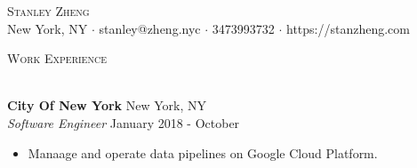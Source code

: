 \documentclass[a4paper]{article}
\newcommand{\lineunder} {
    \vspace*{-8pt} \\
    \hspace*{-18pt} \hrulefill \\
}
\newcommand{\header} [1] {
    {\hspace*{-18pt}\vspace*{6pt} \textsc{#1}}
    \vspace*{-6pt} \lineunder
}
\begin{document}
\vspace*{-40pt}

    

\vspace*{-10pt}
\begin{center}
	{\Huge \scshape {Stanley Zheng}}\\
	New York, NY $\cdot$ stanley@zheng.nyc $\cdot$ 3473993732 $\cdot$ https://stanzheng.com\\
\end{center}

\header{Work Experience}
\vspace{1mm}

\textbf{City Of New York} \hfill New York, NY\\
\textit{Software Engineer} \hfill January 2018 - October\\
\vspace{-1mm}
\begin{itemize} \itemsep 1pt
	\item Manaage and operate data pipelines on Google Cloud Platform.
\end{itemize}
\end{document}
